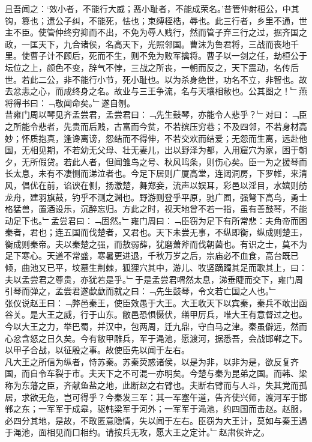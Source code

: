 {{且吾闻之：‘效小者，不能行大威；恶小耻者，不能成荣名。’昔管仲射桓公，中其钩，篡也；遗公子纠，不能死，怯也；束缚桎梏，辱也。此三行者，乡里不通，世主不臣。使管仲终穷抑而不出，不免为辱人贱行，然而管子弃三行之过，据齐国之政，一匡天下，九合诸侯，名高天下，光照邻国。曹沫为鲁君将，三战而丧地千里。使曹子计不顾后，死而不生，则不免为败军擒将。曹子以一剑之任，劫桓公于坛位之上，颜色不变，辞气不悖，三战之所丧，一朝而反之，天下震动，名传后世。若此二公，非不能行小节，死小耻也。以为杀身绝世，功名不立，非智也。故去忿恚之心，而成终身之名。故业与三王争流，名与天壤相敝也。公其图之！﹂燕将得书曰：﹁敬闻命矣。﹂遂自刎。\\
昔雍门周以琴见齐孟尝君，孟尝君曰：﹁先生鼓琴，亦能令人悲乎？﹂对曰：﹁臣之所能令悲者，先贵而后贱，古富而今贫，不若摈压穷巷；不及四邻，不若身材高妙；怀质抱真，逢谗离谤，怨结而不得伸，不若交欢而结爱；无怨而生离，远赴他国，无相见期，不若幼无父母、壮无妻儿，出以野泽为都，入用窟穴为家，困于朝夕，无所假贷。若此人者，但闻雏鸟之号、秋风鸣条，则伤心矣。臣一为之援琴而长太息，未有不凄恻而涕泣者也。今足下居则广厦高堂，连闼洞房，下罗帷，来清风，倡优在前，谄谀在侧，扬激楚，舞郑妾，流声以娱耳，彩邑以淫目，水嬉则舫龙舟，建羽旗鼓，钓乎不测之渊也。野游则登乎平原，驰广囿，强弩下高鸟，勇士格猛兽，置酒设乐，沉醉忘归。方此之时，视天地曾不若一指，虽有善鼓琴，不能动足下也。﹂孟尝君曰：﹁固然。﹂雍门周曰：﹁臣窃为足下有所常悲：夫角帝而困秦者，君也；连五国而伐楚者，又君也。天下未尝无事，不纵即衡，纵成则楚王，衡成则秦帝。夫以秦楚之强，而敖弱薛，犹磨萧斧而伐朝菌也。有识之士，莫不为足下寒心。天道不常盛，寒暑更进退，千秋万岁之后，宗庙必不血食，高台既已倾，曲池又已平，坟墓生荆棘，狐狸穴其中，游儿、牧竖蹢躅其足而歌其上，曰：夫以孟尝君之尊贵，亦犹若是乎。﹂于是孟尝君喟然太息，涕垂睫而交下，雍门周引琴而弹之，孟尝君遂歔歔而就之曰：﹁先生鼓琴，令文若亡国之人也。﹂}\\
张仪说赵王曰：﹁弊邑秦王，使臣效愚于大王。大王收天下以宾秦，秦兵不敢出函谷关。是大王之威，行于山东。敝邑恐惧慑伏，缮甲厉兵，唯大王有意督过之也。今以大王之力，举巴蜀，并汉中，包两周，迁九鼎，守白马之津。秦虽僻远，然而心忿含怒之日久矣。今有敝甲雕兵，军于渑池，愿渡河，据悉吾，会战邯郸之下。以甲子合战，以征殷之事。故使臣先以闻于左右。\\
凡大王之所信为纵者，恃苏秦。苏秦荧惑诸侯，以是为非，以非为是，欲反复齐国，而自令车裂于市。夫天下之不可混一亦明矣。今楚与秦为昆弟之国。而韩、梁称为东藩之臣，齐献鱼盐之地，此断赵之右臂也。夫断右臂而与人斗，失其党而孤居，求欲无危，岂可得乎？今秦发三军：其一军塞午道，告齐使兴师，渡河军于邯郸之东；一军军于成皋，驱韩梁军于河外；一军军于渑池，约四国而击赵。赵服，必四分其地，是故，不敢匿意隐情，失以闻于左右。臣窃为大王计，莫如与秦王遇于渑池，面相见而口相约。请按兵无攻，愿大王之定计。﹂赵肃侯许之。
}
